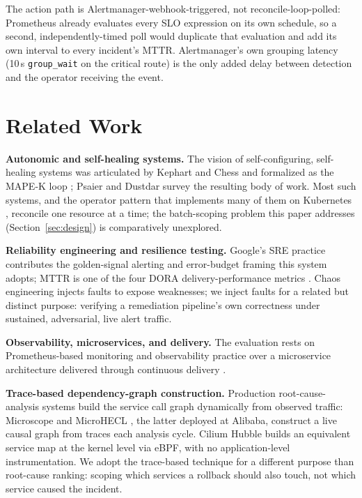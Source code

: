 \documentclass[conference]{IEEEtran}
\begin{document}
The action path is Alertmanager-webhook-triggered, not reconcile-loop-polled: Prometheus already evaluates every SLO expression on its own schedule, so a second, independently-timed poll would duplicate that evaluation and add its own interval to every incident's MTTR. Alertmanager's own grouping latency (10\,s \texttt{group\_wait} on the critical route) is the only added delay between detection and the operator receiving the event.

\section{Related Work}
\textbf{Autonomic and self-healing systems.} The vision of self-configuring, self-healing systems was articulated by Kephart and Chess \cite{kephart2003vision} and formalized as the MAPE-K loop \cite{ibm2006blueprint}; Psaier and Dustdar \cite{psaier2011survey} survey the resulting body of work. Most such systems, and the operator pattern that implements many of them on Kubernetes \cite{burns2016borg,dobies2020operators}, reconcile one resource at a time; the batch-scoping problem this paper addresses (Section~\ref{sec:design}) is comparatively unexplored.

\textbf{Reliability engineering and resilience testing.} Google's SRE practice \cite{beyer2016sre} contributes the golden-signal alerting and error-budget framing this system adopts; MTTR is one of the four DORA delivery-performance metrics \cite{forsgren2018accelerate}. Chaos engineering \cite{basiri2016chaos} injects faults to expose weaknesses; we inject faults for a related but distinct purpose: verifying a remediation pipeline's own correctness under sustained, adversarial, live alert traffic.

\textbf{Observability, microservices, and delivery.} The evaluation rests on Prometheus-based monitoring \cite{brazil2018prometheus} and observability practice \cite{sridharan2018observability} over a microservice architecture \cite{dragoni2017microservices,newman2021microservices} delivered through continuous delivery \cite{humble2010continuous}.

\textbf{Trace-based dependency-graph construction.} Production root-cause-analysis systems build the service call graph dynamically from observed traffic: Microscope \cite{lin2018microscope} and MicroHECL \cite{liu2021microhecl}, the latter deployed at Alibaba, construct a live causal graph from traces each analysis cycle. Cilium Hubble \cite{cilium2024hubble} builds an equivalent service map at the kernel level via eBPF, with no application-level instrumentation. We adopt the trace-based technique for a different purpose than root-cause ranking: scoping which services a rollback should also touch, not which service caused the incident.
\end{document}
